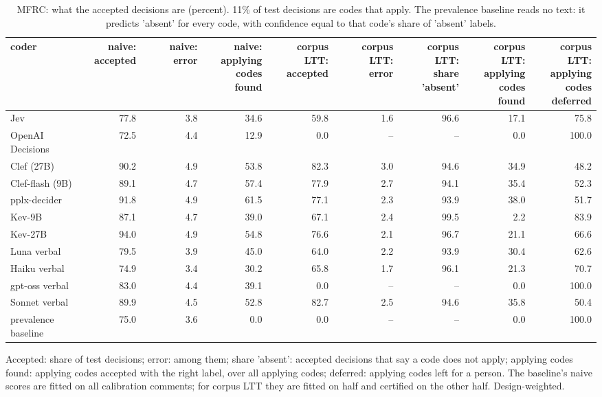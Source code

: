 \begin{table}[t]
\centering
\small
\caption{MFRC: what the accepted decisions are (percent). 11\% of test decisions are codes that apply. The prevalence baseline reads no text: it predicts 'absent' for every code, with confidence equal to that code's share of 'absent' labels.}
\label{tab:main_mfrc}
\begin{adjustbox}{max width=\linewidth}
\begin{tabular}{lrrrrrrrr}
\toprule
coder & \makecell[br]{naive: \\{} accepted} & naive: error & \makecell[br]{naive: \\{} applying \\{} codes found} & \makecell[br]{corpus LTT: \\{} accepted} & \makecell[br]{corpus LTT: \\{} error} & \makecell[br]{corpus LTT: \\{} share \\{} 'absent'} & \makecell[br]{corpus LTT: \\{} applying \\{} codes found} & \makecell[br]{corpus LTT: \\{} applying \\{} codes \\{} deferred} \\
\midrule
Jev & 77.8 & 3.8 & 34.6 & 59.8 & 1.6 & 96.6 & 17.1 & 75.8 \\
OpenAI Decisions & 72.5 & 4.4 & 12.9 & 0.0 & -- & -- & 0.0 & 100.0 \\
Clef (27B) & 90.2 & 4.9 & 53.8 & 82.3 & 3.0 & 94.6 & 34.9 & 48.2 \\
Clef-flash (9B) & 89.1 & 4.7 & 57.4 & 77.9 & 2.7 & 94.1 & 35.4 & 52.3 \\
pplx-decider & 91.8 & 4.9 & 61.5 & 77.1 & 2.3 & 93.9 & 38.0 & 51.7 \\
Kev-9B & 87.1 & 4.7 & 39.0 & 67.1 & 2.4 & 99.5 & 2.2 & 83.9 \\
Kev-27B & 94.0 & 4.9 & 54.8 & 76.6 & 2.1 & 96.7 & 21.1 & 66.6 \\
Luna verbal & 79.5 & 3.9 & 45.0 & 64.0 & 2.2 & 93.9 & 30.4 & 62.6 \\
Haiku verbal & 74.9 & 3.4 & 30.2 & 65.8 & 1.7 & 96.1 & 21.3 & 70.7 \\
gpt-oss verbal & 83.0 & 4.4 & 39.1 & 0.0 & -- & -- & 0.0 & 100.0 \\
Sonnet verbal & 89.9 & 4.5 & 52.8 & 82.7 & 2.5 & 94.6 & 35.8 & 50.4 \\
\midrule
prevalence baseline & 75.0 & 3.6 & 0.0 & 0.0 & -- & -- & 0.0 & 100.0 \\
\bottomrule
\end{tabular}
\end{adjustbox}
\par\smallskip\footnotesize\raggedright Accepted: share of test decisions; error: among them; share 'absent': accepted decisions that say a code does not apply; applying codes found: applying codes accepted with the right label, over all applying codes; deferred: applying codes left for a person. The baseline's naive scores are fitted on all calibration comments; for corpus LTT they are fitted on half and certified on the other half. Design-weighted.
\end{table}
